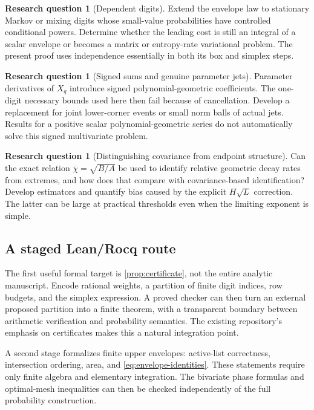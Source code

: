 \documentclass[11pt,a4paper]{article}
\theoremstyle{definition}
\newtheorem{question}[theorem]{Research question}
\theoremstyle{remark}
\numberwithin{equation}{section}
\begin{document}
\begin{question}[Dependent digits]
Extend the envelope law to stationary Markov or mixing digits whose
small-value probabilities have controlled conditional powers. Determine
whether the leading cost is still an integral of a scalar envelope or
becomes a matrix or entropy-rate variational problem. The present proof
uses independence essentially in both its box and simplex steps.
\end{question}

\begin{question}[Signed sums and genuine parameter jets]
Parameter derivatives of $X_q$ introduce signed polynomial-geometric
coefficients. The one-digit necessary bounds used here then fail because
of cancellation. Develop a replacement for joint lower-corner events or
small norm balls of actual jets. Results for a positive scalar
polynomial-geometric series do not automatically solve this signed
multivariate problem.
\end{question}

\begin{question}[Distinguishing covariance from endpoint structure]
Can the exact relation $\overline\chi=\sqrt{B/A}$ be used to identify
relative geometric decay rates from extremes, and how does that compare
with covariance-based identification? Develop estimators and quantify
bias caused by the explicit $H\sqrt L$ correction. The latter can be
large at practical thresholds even when the limiting exponent is simple.
\end{question}

\subsection{A staged Lean/Rocq route}
The first useful formal target is \cref{prop:certificate}, not the entire
analytic manuscript. Encode rational weights, a partition of finite digit
indices, row budgets, and the simplex expression. A proved checker can
then turn an external proposed partition into a finite theorem, with a
transparent boundary between arithmetic verification and probability
semantics. The existing repository's emphasis on certificates makes this
a natural integration point.

A second stage formalizes finite upper envelopes: active-list correctness,
intersection ordering, area, and \eqref{eq:envelope-identities}. These
statements require only finite algebra and elementary integration. The
bivariate phase formulas and optimal-mesh inequalities can then be checked
independently of the full probability construction.
\end{document}
